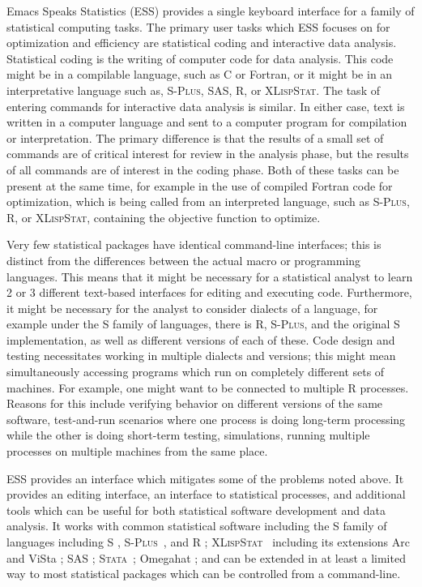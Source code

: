 \documentclass{article}
\newcommand*{\Splus}{\textsc{S-Plus}}
\newcommand*{\XLispStat}{\textsc{XLispStat}}
\newcommand*{\Stata}{\textsc{Stata}}
\begin{document}
Emacs Speaks Statistics (ESS) provides a single keyboard interface for
a family of statistical computing tasks.  The primary user tasks which
ESS focuses on for optimization and efficiency are statistical coding
and interactive data analysis.  Statistical coding is the writing of
computer code for data analysis.  This code might be in a compilable
language, such as C or Fortran, or it might be in an interpretative
language such as, \Splus, SAS, R, or \XLispStat.  The task of entering
commands for interactive data analysis is similar.  In either case,
text is written in a computer language and sent to a computer program
for compilation or interpretation.  The primary difference is that the
results of a small set of commands are of critical interest for review
in the analysis phase, but the results of all commands are of interest
in the coding phase.  Both of these tasks can be present at the same
time, for example in the use of compiled Fortran code for
optimization, which is being called from an interpreted language, such
as \Splus, R, or \XLispStat, containing the objective function to
optimize.

Very few statistical packages have identical command-line interfaces;
this is distinct from the differences between the actual macro or
programming languages.  This means that it might be necessary for a
statistical analyst to learn 2 or 3 different text-based interfaces
for editing and executing code.  Furthermore, it might be necessary
for the analyst to consider dialects of a language, for example under
the S family of languages, there is R, \Splus, and the original S
implementation, as well as different versions of each of these.
Code design and testing necessitates working in multiple
dialects  and versions; this might mean simultaneously accessing programs
which run on completely different sets of machines.  For
example, one might want to be connected to multiple R processes.
Reasons for this include verifying behavior on different versions of
the same software, test-and-run scenarios where one process is doing
long-term processing while the other is doing short-term testing,
simulations, running multiple processes on multiple machines from the
same place.

ESS provides an interface which mitigates some of the problems noted
above.  It provides an editing interface, an interface to statistical
processes, and additional tools which can be useful for both
statistical software development and data analysis.  It works with
common statistical software including the S family of languages
including S \citep{BecRCW88,ChaJH92,ChaJ98}, \Splus\ \citep{Splus},
and R \citep{ihak:gent:1996}; \XLispStat\ \citep{Tier90} including its
extensions Arc \citep{Cook:Weisberg:1999} and ViSta
\citep{youn:fald:mcfa:1992}; SAS \citep{SAS:8.0}; \Stata\
\citep{Stata:6.0}; Omegahat \citep{DTLang:2000}; and can be extended
in at least a limited way to most statistical packages which can be
controlled from a command-line.
\end{document}
